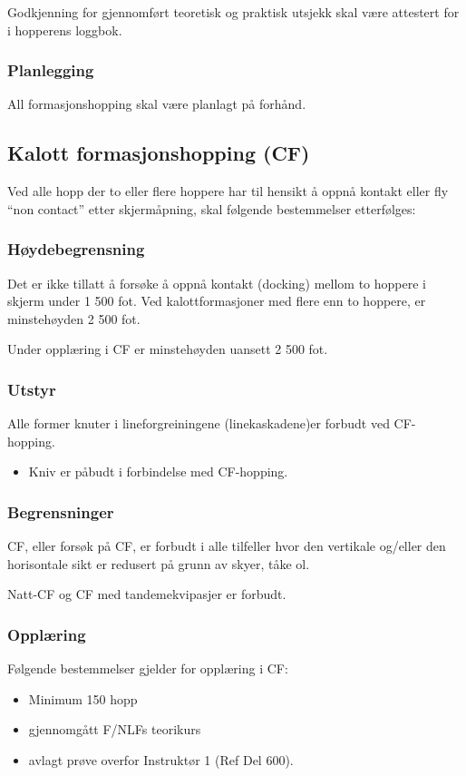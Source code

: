Godkjenning for gjennomført teoretisk og praktisk utsjekk skal være attestert for i hopperens loggbok.

\subsubsection{Planlegging}
All formasjonshopping skal være planlagt på forhånd.

\subsection{Kalott formasjonshopping (CF)}
Ved alle hopp der to eller flere hoppere har til hensikt å oppnå kontakt eller fly ``non contact'' etter skjermåpning, skal følgende bestemmelser etterfølges:

\subsubsection{Høydebegrensning}
Det er ikke tillatt å forsøke å oppnå kontakt (docking) mellom to hoppere i skjerm under 1 500 fot. Ved kalottformasjoner med flere enn to hoppere, er minstehøyden 2 500 fot.

Under opplæring i CF er minstehøyden uansett 2 500 fot.

\subsubsection{Utstyr}
Alle former knuter i lineforgreiningene (linekaskadene)er forbudt ved CF- hopping.
\begin{itemize}
	\item Kniv er påbudt i forbindelse med CF-hopping.
\end{itemize}

\subsubsection{Begrensninger}
CF, eller forsøk på CF, er forbudt i alle tilfeller hvor den vertikale og/eller den horisontale sikt er redusert på grunn av skyer, tåke ol.

Natt-CF og CF med tandemekvipasjer er forbudt.

\subsubsection{Opplæring}
Følgende bestemmelser gjelder for opplæring i CF:
\begin{itemize}
	\item Minimum 150 hopp
	\item gjennomgått F/NLFs teorikurs
	\item avlagt prøve overfor Instruktør 1 (Ref Del 600).
\end{itemize}

